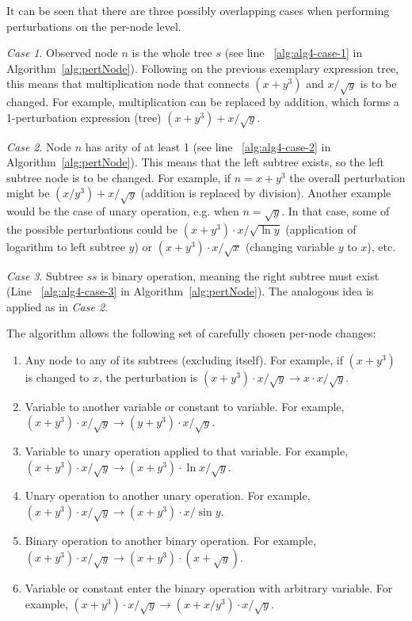 \documentclass[a4paper,12pt]{elsarticle}
\begin{document}
It can be seen that there are three possibly overlapping cases when performing perturbations on the per-node level. 

\emph{Case 1}. 
Observed node $n$ is the whole tree $s$ (see line ~\ref{alg:alg4-case-1} in Algorithm~\ref{alg:pertNode}). Following on   the previous exemplary expression tree, this means that multiplication node that connects $(x+y^3)$ and $x/\sqrt{y}$ is to be changed. For example, multiplication can be replaced by addition, which forms a 1-perturbation expression (tree) $(x+y^3)+ x/\sqrt{y}$. 


\emph{Case 2}. 
Node $n$ has arity of at least 1 (see line ~\ref{alg:alg4-case-2} in Algorithm~\ref{alg:pertNode}). This means that the left subtree exists, so the left subtree node is to be changed. 
For example, if $n=x+y^3$ the overall perturbation might be $(x/y^3)+x/\sqrt{y}$ (addition is replaced by division). 
Another example would be the case of unary operation, e.g. when $n=\sqrt{y}$. In that case, some of the possible perturbations could be $(x+y^3)\cdot x/\sqrt{\ln{y}}$ (application of logarithm to left subtree $y$) or $(x+y^3)\cdot x/\sqrt{x}$ (changing variable $y$ to $x$), etc.

\emph{Case 3}. 
Subtree $ss$ is binary operation, meaning the right subtree must exist (Line ~\ref{alg:alg4-case-3} in Algorithm~\ref{alg:pertNode}). 
The analogous idea is applied as in \emph{Case 2}. 

The algorithm allows the following set of carefully chosen per-node changes: 

\begin{enumerate}
	\item Any node to any of its subtrees (excluding itself). For example, if $(x+y^3)$ is changed to $x$, the perturbation is $(x+y^3)\cdot x/\sqrt{y} \rightarrow x\cdot x/\sqrt{y}$. 
	\item Variable to another variable or constant to variable. For example,  $(x+y^3)\cdot x/\sqrt{y} \rightarrow (y+y^3)\cdot x/\sqrt{y}$.
	\item Variable to unary operation applied to that variable. For example,  $(x+y^3)\cdot x/\sqrt{y} \rightarrow (x+y^3)\cdot \ln{x}/\sqrt{y}$.
	\item Unary operation to another unary operation. For example,  $(x+y^3)\cdot x/\sqrt{y} \rightarrow (x+y^3)\cdot x/\sin{y}$.
	\item Binary operation to another binary operation. For example,  $(x+y^3)\cdot x/\sqrt{y} \rightarrow (x+y^3)\cdot (x + \sqrt{y})$. 
	\item Variable or constant enter the binary operation with arbitrary variable. For example,  $(x+y^3)\cdot x/\sqrt{y} \rightarrow (x+x/y^3)\cdot x/\sqrt{y}$. 
\end{enumerate} 
\end{document}
